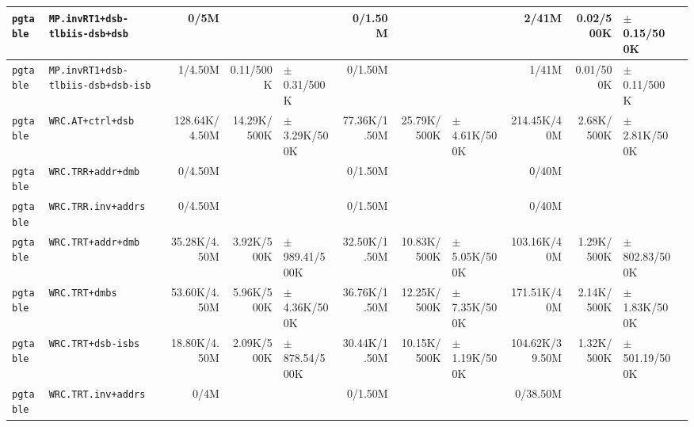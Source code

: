 \begin{tabular}{l l  | r r l | r r l | r r l l}
        \verb|pgtable| &                         \verb|MP.invRT1+dsb-tlbiis-dsb+dsb| &           0/5M &                       &                   &        0/1.50M &                       &                   &          2/41M &             0.02/500K &    $\pm$ 0.15/500K & \\ \hline 
        \verb|pgtable| &                     \verb|MP.invRT1+dsb-tlbiis-dsb+dsb-isb| &        1/4.50M &             0.11/500K &   $\pm$ 0.31/500K &        0/1.50M &                       &                   &          1/41M &             0.01/500K &    $\pm$ 0.11/500K & \\ \hline 
        \verb|pgtable| &                                      \verb|WRC.AT+ctrl+dsb| &  128.64K/4.50M &           14.29K/500K &  $\pm$ 3.29K/500K &   77.36K/1.50M &           25.79K/500K &  $\pm$ 4.61K/500K &    214.45K/40M &            2.68K/500K &   $\pm$ 2.81K/500K & \\ \hline 
        \verb|pgtable| &                                     \verb|WRC.TRR+addr+dmb| &        0/4.50M &                       &                   &        0/1.50M &                       &                   &          0/40M &                       &                    & \\ \hline 
        \verb|pgtable| &                                    \verb|WRC.TRR.inv+addrs| &        0/4.50M &                       &                   &        0/1.50M &                       &                   &          0/40M &                       &                    & \\ \hline 
        \verb|pgtable| &                                     \verb|WRC.TRT+addr+dmb| &   35.28K/4.50M &            3.92K/500K & $\pm$ 989.41/500K &   32.50K/1.50M &           10.83K/500K &  $\pm$ 5.05K/500K &    103.16K/40M &            1.29K/500K &  $\pm$ 802.83/500K & \\ \hline 
        \verb|pgtable| &                                         \verb|WRC.TRT+dmbs| &   53.60K/4.50M &            5.96K/500K &  $\pm$ 4.36K/500K &   36.76K/1.50M &           12.25K/500K &  $\pm$ 7.35K/500K &    171.51K/40M &            2.14K/500K &   $\pm$ 1.83K/500K & \\ \hline 
        \verb|pgtable| &                                     \verb|WRC.TRT+dsb-isbs| &   18.80K/4.50M &            2.09K/500K & $\pm$ 878.54/500K &   30.44K/1.50M &           10.15K/500K &  $\pm$ 1.19K/500K & 104.62K/39.50M &            1.32K/500K &  $\pm$ 501.19/500K & \\ \hline 
        \verb|pgtable| &                                    \verb|WRC.TRT.inv+addrs| &           0/4M &                       &                   &        0/1.50M &                       &                   &       0/38.50M &                       &                    & \\ \hline 

\end{tabular}
